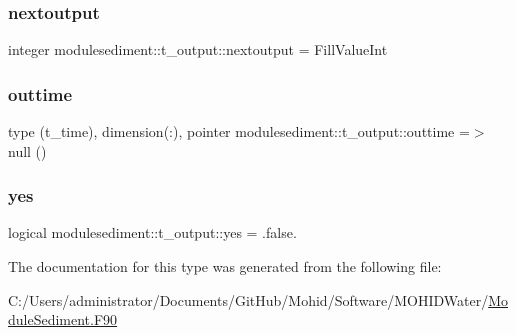 \subsubsection{\texorpdfstring{nextoutput}{nextoutput}}
{\footnotesize\ttfamily integer modulesediment\+::t\+\_\+output\+::nextoutput = Fill\+Value\+Int\hspace{0.3cm}{\ttfamily [private]}}

\mbox{\label{structmodulesediment_1_1t__output_a1cd979d34cf8f4ee4afcbef5566acf6d}} 
\subsubsection{\texorpdfstring{outtime}{outtime}}
{\footnotesize\ttfamily type (t\+\_\+time), dimension(\+:), pointer modulesediment\+::t\+\_\+output\+::outtime =$>$ null ()\hspace{0.3cm}{\ttfamily [private]}}

\mbox{\label{structmodulesediment_1_1t__output_a8f7bdcfd69bbf8d652fb9cc410242c65}} 
\subsubsection{\texorpdfstring{yes}{yes}}
{\footnotesize\ttfamily logical modulesediment\+::t\+\_\+output\+::yes = .false.\hspace{0.3cm}{\ttfamily [private]}}



The documentation for this type was generated from the following file\+:\begin{DoxyCompactItemize}
\item 
C\+:/\+Users/administrator/\+Documents/\+Git\+Hub/\+Mohid/\+Software/\+M\+O\+H\+I\+D\+Water/\mbox{\hyperlink{_module_sediment_8_f90}{Module\+Sediment.\+F90}}\end{DoxyCompactItemize}

